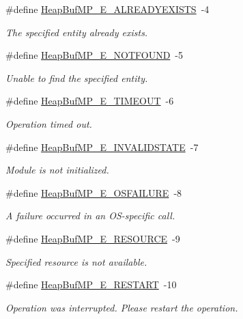 \begin{DoxyCompactItemize}
\#define \hyperlink{_heap_buf_m_p_8h_a27b1533d0d529ecdd7d6a7d7090aa5a7}{Heap\-Buf\-M\-P\-\_\-\-E\-\_\-\-A\-L\-R\-E\-A\-D\-Y\-E\-X\-I\-S\-T\-S}~-\/4
\begin{DoxyCompactList}\small\item\em The specified entity already exists. \end{DoxyCompactList}\item 
\#define \hyperlink{_heap_buf_m_p_8h_a413c47cfb2257df264b84951abc0409f}{Heap\-Buf\-M\-P\-\_\-\-E\-\_\-\-N\-O\-T\-F\-O\-U\-N\-D}~-\/5
\begin{DoxyCompactList}\small\item\em Unable to find the specified entity. \end{DoxyCompactList}\item 
\#define \hyperlink{_heap_buf_m_p_8h_aa2bf7936fb8db078713544c7ee1197fd}{Heap\-Buf\-M\-P\-\_\-\-E\-\_\-\-T\-I\-M\-E\-O\-U\-T}~-\/6
\begin{DoxyCompactList}\small\item\em Operation timed out. \end{DoxyCompactList}\item 
\#define \hyperlink{_heap_buf_m_p_8h_a72fbd9726f36a122c3462ab151e67518}{Heap\-Buf\-M\-P\-\_\-\-E\-\_\-\-I\-N\-V\-A\-L\-I\-D\-S\-T\-A\-T\-E}~-\/7
\begin{DoxyCompactList}\small\item\em Module is not initialized. \end{DoxyCompactList}\item 
\#define \hyperlink{_heap_buf_m_p_8h_a7b0421d7bd809415074b1483f044162f}{Heap\-Buf\-M\-P\-\_\-\-E\-\_\-\-O\-S\-F\-A\-I\-L\-U\-R\-E}~-\/8
\begin{DoxyCompactList}\small\item\em A failure occurred in an O\-S-\/specific call. \end{DoxyCompactList}\item 
\#define \hyperlink{_heap_buf_m_p_8h_a7354bfdbab3d4d028d0c6d48edd308a7}{Heap\-Buf\-M\-P\-\_\-\-E\-\_\-\-R\-E\-S\-O\-U\-R\-C\-E}~-\/9
\begin{DoxyCompactList}\small\item\em Specified resource is not available. \end{DoxyCompactList}\item 
\#define \hyperlink{_heap_buf_m_p_8h_a445c7db0d4aa1939dc33cefe24f6c4df}{Heap\-Buf\-M\-P\-\_\-\-E\-\_\-\-R\-E\-S\-T\-A\-R\-T}~-\/10
\begin{DoxyCompactList}\small\item\em Operation was interrupted. Please restart the operation. \end{DoxyCompactList}\end{DoxyCompactItemize}
